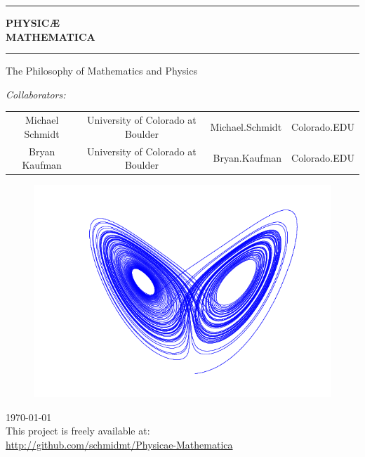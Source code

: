 \begin{titlepage}
\begin{center}
\hrule
{ \huge \bfseries PHYSIC\AE\\  MATHEMATICA}\\[0.5cm]
\hrule
The Philosophy of Mathematics and Physics

\emph{Collaborators:}\\
\begin{tabular}[center]{ccr@{@}l}
    Michael Schmidt & University of Colorado at Boulder & Michael.Schmidt & Colorado.EDU\\
    Bryan Kaufman & University of Colorado at Boulder & Bryan.Kaufman & Colorado.EDU \\
\end{tabular}

\begin{figure}[!h]
    \centering
	\includegraphics[scale=0.60]{./attractor.png}
\end{figure}

\vfill
{\large \today}\\

This project is freely available at:\\
\url{http://github.com/schmidmt/Physicae-Mathematica}

\end{center}

\vfill





\end{titlepage}
